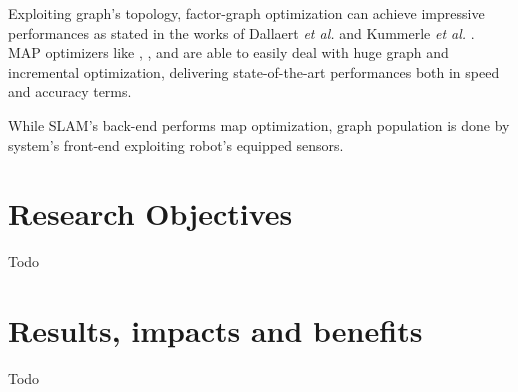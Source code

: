 \documentclass[10pt,a4paper, notitlepage]{report}
\begin{document}
Exploiting graph's topology, factor-graph optimization can achieve impressive performances as stated in the works of Dallaert \textit{et al.} \cite{dellaert2006square} and Kummerle \textit{et al.}  \cite{kummerle2011g}. MAP optimizers like \cite{kummerle2011g}, \cite{dellaert2012gtsam}, \cite{ceres-solver} and \cite{kaess2012isam2} are able to easily deal with huge graph and incremental optimization, delivering state-of-the-art performances both in speed and accuracy terms.

While SLAM's back-end performs map optimization, graph population is done by system's front-end exploiting robot's equipped sensors. 

\section*{Research Objectives}
Todo

\section*{Results, impacts and benefits}
Todo






\end{document}
